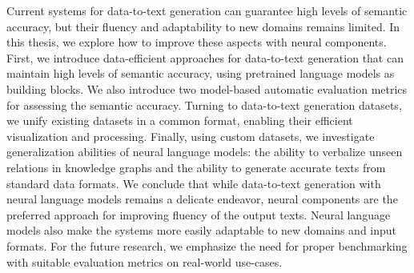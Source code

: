 Current systems for data-to-text generation can guarantee high levels of semantic accuracy, but their fluency and adaptability to new domains remains limited. In this thesis, we explore how to improve these aspects with neural components. First, we introduce data-efficient approaches for data-to-text generation that can maintain high levels of semantic accuracy, using pretrained language models as building blocks. We also introduce two model-based automatic evaluation metrics for assessing the semantic accuracy. Turning to data-to-text generation datasets, we unify existing datasets in a common format, enabling their efficient visualization and processing. Finally, using custom datasets, we investigate generalization abilities of neural language models: the ability to verbalize unseen relations in knowledge graphs and the ability to generate accurate texts from standard data formats. We conclude that while data-to-text generation with neural language models remains a delicate endeavor, neural components are the preferred approach for improving fluency of the output texts. Neural language models also make the systems more easily adaptable to new domains and input formats. For the future research, we emphasize the need for proper benchmarking with suitable evaluation metrics on real-world use-cases.
